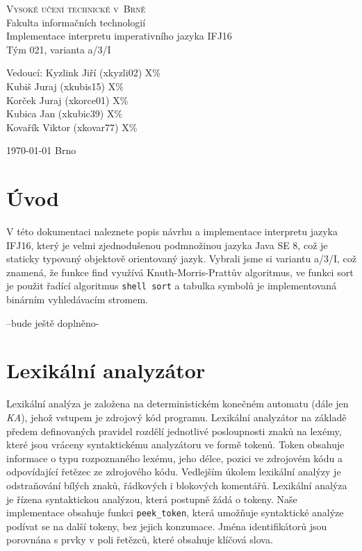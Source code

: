 \documentclass[a4paper,11pt]{article}
\begin{document}
\begin{center}
\Huge
\textsc{Vysoké učení technické v~Brně\\
}Fakulta informačních technologií\\
\LARGE Implementace interpretu imperativního jazyka IFJ16 \\
\Huge Tým 021, varianta a/3/I\\

\Large Vedoucí:	Kyzlink Jiří 	(xkyzli02)	X\%	\\ %
				Kubiš Juraj		(xkubis15)	X\%	\\
				Korček Juraj	(xkorce01)	X\%	\\
				Kubica Jan		(xkubic39)	X\%	\\
				Kovařík Viktor	(xkovar77)	X\%	\\


\end{center}
{\Large \today \hfill
Brno}
\thispagestyle{empty}

\newpage

\tableofcontents

\newpage
\section{Úvod}
V této dokumentaci naleznete popis návrhu a implementace interpretu jazyka IFJ16, který je velmi zjednodušenou podmnožinou jazyka Java SE 8, což je staticky typovaný objektově orientovaný jazyk. Vybrali jsme si variantu  a/3/I, což znamená, že funkce find využívá Knuth-Morris-Prattův algoritmus, ve funkci sort je použit řadící algoritmus \texttt{shell sort} a tabulka symbolů je implementovaná binárním vyhledávacím stromem.

--bude ještě doplněno-

\section{Lexikální analyzátor}
Lexikální analýza je založena na deterministickém konečném automatu (dále jen \textit{KA}), jehož vstupem je zdrojový kód programu. Lexikální analyzátor na základě předem definovaných pravidel rozdělí jednotlivé posloupnosti znaků na lexémy, které jsou vráceny syntaktickému analyzátoru ve formě tokenů. Token obsahuje informace o typu rozpoznaného lexému, jeho délce, pozici ve zdrojovém kódu a odpovídající řetězec ze zdrojového kódu. Vedlejším úkolem lexikální analýzy je odstraňování bílých znaků, řádkových i blokových komentářů. Lexikální analýza je řízena syntaktickou analýzou, která postupně žádá o tokeny. Naše implementace obsahuje funkci \texttt{peek\_token}, která umožňuje syntaktické analýze podívat se na další tokeny, bez jejich konzumace. Jména identifikátorů jsou porovnána s prvky v poli řetězců, které obsahuje klíčová slova.
\end{document}
